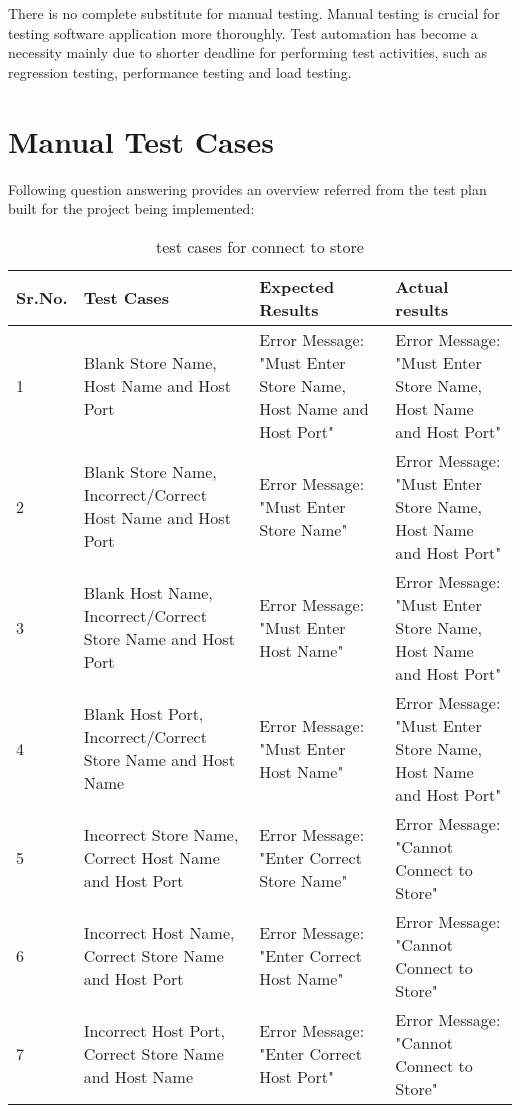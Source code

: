 \hspace*{0.7in}There is no complete substitute for manual testing. Manual testing is crucial for testing software application more thoroughly. Test automation has become a necessity mainly due to shorter deadline for performing test activities, such as regression testing, performance testing and load testing.

\section{Manual Test Cases}
\hspace*{0.7in}Following question answering provides an overview referred from the test plan built for the project being implemented:

\begin{table}[h]
\begin{flushleft}
\caption{test cases for connect to store}\label{test cases for connect to store}
\begin{tabular}{|p{1cm}|p{4cm}|p{4cm}|p{5cm}|} \hline
Sr.No. & Test Cases & Expected Results & Actual results \\ \hline
1 & Blank Store Name, Host Name and Host Port & Error Message: "Must Enter Store Name, Host Name and Host Port" & Error Message: "Must Enter Store Name, Host Name and Host Port" \\	 \hline
2 & Blank Store Name, Incorrect/Correct Host Name and Host Port  & Error Message: "Must Enter Store Name" & Error Message: "Must Enter Store Name, Host Name and Host Port" \\	 \hline
3 & Blank Host Name, Incorrect/Correct Store Name and Host Port & Error Message: "Must Enter Host Name" & Error Message: "Must Enter Store Name, Host Name and Host Port"\\	 \hline
4 & Blank Host Port, Incorrect/Correct Store Name and Host Name & Error Message: "Must Enter Host Name" & Error Message: "Must Enter Store Name, Host Name and Host Port"\\	 \hline
5 & Incorrect Store Name, Correct Host Name and Host Port & Error Message: "Enter Correct Store Name" & Error Message: "Cannot Connect to Store"\\	 \hline
6 & Incorrect Host Name, Correct Store Name and Host Port & Error Message: "Enter Correct Host Name" & Error Message: "Cannot Connect to Store"\\	 \hline
7 & Incorrect Host Port, Correct Store Name and Host Name & Error Message: "Enter Correct Host Port" &Error Message: "Cannot Connect to Store" \\	 \hline

\end{tabular}
\end{flushleft}
\end{table}
